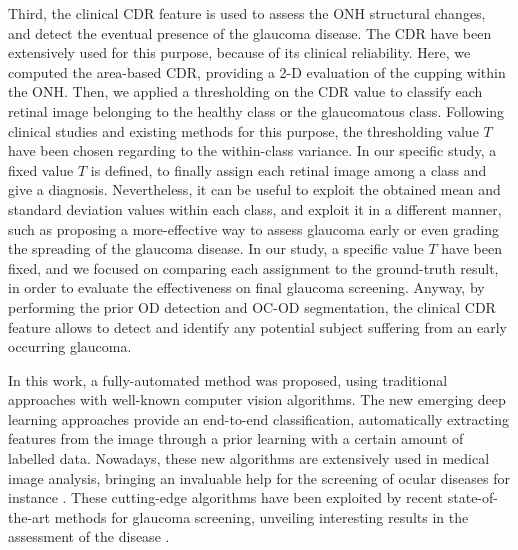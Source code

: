 Third, the clinical CDR feature is used to assess the ONH structural changes, and detect the eventual presence of the glaucoma disease.
The CDR have been extensively used for this purpose, because of its clinical reliability. Here, we computed the area-based CDR, providing a 2-D evaluation of the cupping within the ONH. Then, we applied a thresholding on the CDR value to classify each retinal image belonging to the healthy class or the glaucomatous class. Following clinical studies and existing methods for this purpose, the thresholding value $T$ have been chosen regarding to the within-class variance. In our specific study, a fixed value $T$ is defined, to finally assign each retinal image among a class and give a diagnosis. Nevertheless, it can be useful to exploit the obtained mean and standard deviation values within each class, and exploit it in a different manner, such as proposing a more-effective way to assess glaucoma early or even grading the spreading of the glaucoma disease.
In our study, a specific value $T$ have been fixed, and we focused on comparing each assignment to the ground-truth result, in order to evaluate the effectiveness on final glaucoma screening. Anyway, by performing the prior OD detection and OC-OD segmentation, the clinical CDR feature allows to detect and identify any potential subject suffering from an early occurring glaucoma.

In this work, a fully-automated method was proposed, using traditional approaches with well-known computer vision algorithms. The new emerging deep learning approaches provide an end-to-end classification, automatically extracting features from the image  through a prior learning with a certain amount of labelled data. Nowadays, these new algorithms are extensively used in medical image analysis, bringing an invaluable help for the screening of ocular diseases for instance \citep{gulshan}. These cutting-edge algorithms have been exploited by recent state-of-the-art methods for glaucoma screening, unveiling interesting results in the assessment of the disease \citep{norouzifard, zilly}.